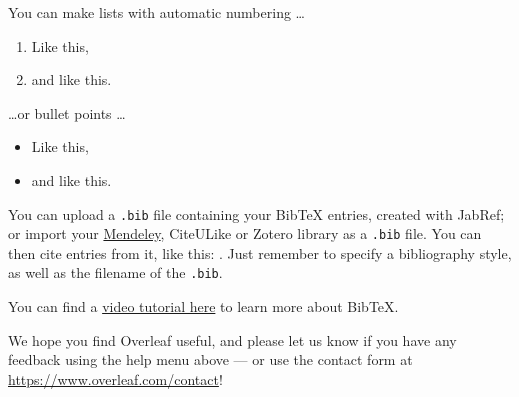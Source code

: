 \documentclass[a4paper]{article}
\begin{document}
You can make lists with automatic numbering \dots

\begin{enumerate}
\item Like this,
\item and like this.
\end{enumerate}
\dots or bullet points \dots
\begin{itemize}
\item Like this,
\item and like this.
\end{itemize}

You can upload a \verb|.bib| file containing your BibTeX entries, created with JabRef; or import your \href{https://www.overleaf.com/blog/184}{Mendeley}, CiteULike or Zotero library as a \verb|.bib| file. You can then cite entries from it, like this: \cite{greenwade93}. Just remember to specify a bibliography style, as well as the filename of the \verb|.bib|.

You can find a \href{https://www.overleaf.com/help/97-how-to-include-a-bibliography-using-bibtex}{video tutorial here} to learn more about BibTeX.

We hope you find Overleaf useful, and please let us know if you have any feedback using the help menu above --- or use the contact form at \url{https://www.overleaf.com/contact}!



\end{document}
